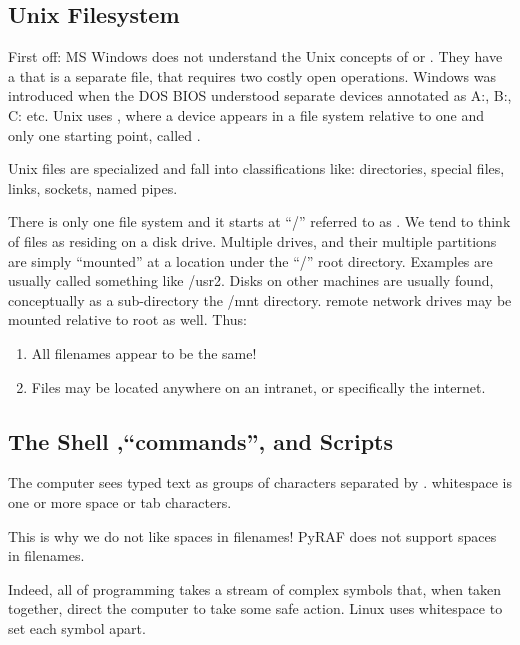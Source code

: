 \subsection*{Unix Filesystem}

First off: MS Windows does not understand the Unix concepts of
 or . They have a 
that is a separate file, that requires two costly open operations.
Windows was introduced when the DOS BIOS understood separate devices
annotated as A:, B:, C: etc. Unix uses , where a device
appears in a file system relative to one and only one starting point,
called . 

Unix files are specialized and fall into classifications like: directories,
special files, links, sockets, named pipes.

There is only one file system and it starts at ``/'' referred to as
.  We tend to think of files as residing on a disk
drive. Multiple drives, and their multiple partitions are simply
``mounted'' at a location under the ``/'' root directory. Examples are
usually called something like /usr2. Disks on other machines are
usually found, conceptually as a sub-directory the /mnt directory.
remote network drives may be mounted relative to root as well. 
Thus:
\vspace{-.15cm}
\begin{enumerate}\addtolength{\itemsep}{-0.5\baselineskip}
   \item   All filenames appear to be the same!
   \item   Files may be located anywhere on an intranet, or specifically the internet.
\end{enumerate}

\subsection*{The Shell ,``commands'', and Scripts}

The computer sees typed text as groups of characters separated by 
. whitespace is one or more space or tab characters.

This is why we do not like spaces in filenames! PyRAF does not support
spaces in filenames.

Indeed, all of programming takes a stream of complex symbols that, when
taken together, direct the computer to take some safe action. Linux
uses whitespace to set each symbol apart. 

